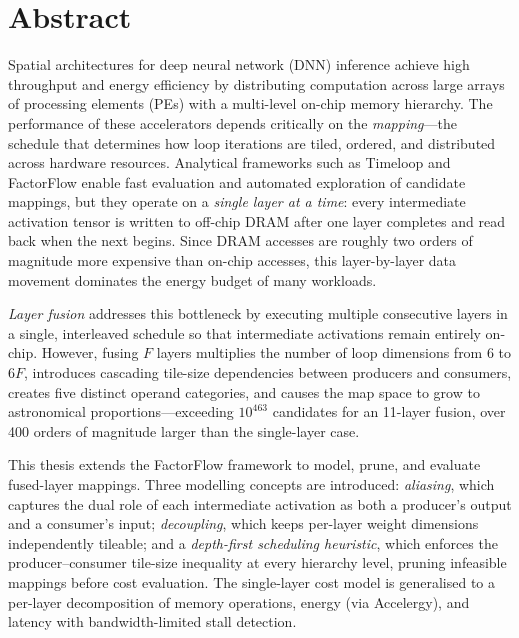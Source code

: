\chapter*{Abstract}
\label{ch:abstract}

Spatial architectures for deep neural network (DNN) inference achieve
high throughput and energy efficiency by distributing computation across
large arrays of processing elements (PEs) with a multi-level on-chip
memory hierarchy.
The performance of these accelerators depends critically on the
\emph{mapping}---the schedule that determines how loop iterations are
tiled, ordered, and distributed across hardware resources.
Analytical frameworks such as Timeloop and FactorFlow enable fast
evaluation and automated exploration of candidate mappings, but they
operate on a \emph{single layer at a time}: every intermediate
activation tensor is written to off-chip DRAM after one layer completes
and read back when the next begins.
Since DRAM accesses are roughly two orders of magnitude more expensive
than on-chip accesses, this layer-by-layer data movement dominates the
energy budget of many workloads.

\emph{Layer fusion} addresses this bottleneck by executing multiple
consecutive layers in a single, interleaved schedule so that
intermediate activations remain entirely on-chip.
However, fusing $F$ layers multiplies the number of loop dimensions
from 6 to $6F$, introduces cascading tile-size dependencies between
producers and consumers, creates five distinct operand categories, and
causes the map space to grow to astronomical proportions---exceeding
$10^{463}$ candidates for an 11-layer fusion, over 400 orders of
magnitude larger than the single-layer case.

This thesis extends the FactorFlow framework to model, prune, and
evaluate fused-layer mappings.
Three modelling concepts are introduced: \emph{aliasing}, which
captures the dual role of each intermediate activation as both a
producer's output and a consumer's input; \emph{decoupling}, which
keeps per-layer weight dimensions independently tileable; and a
\emph{depth-first scheduling heuristic}, which enforces the
producer--consumer tile-size inequality at every hierarchy level,
pruning infeasible mappings before cost evaluation.
The single-layer cost model is generalised to a per-layer decomposition
of memory operations, energy (via Accelergy), and latency with
bandwidth-limited stall detection.

